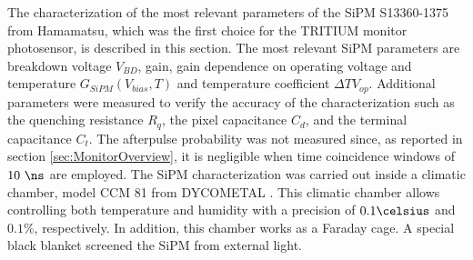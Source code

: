 The characterization of the most relevant parameters of the SiPM S13360-1375 from Hamamatsu, which was the first choice for the TRITIUM monitor photosensor, is described in this section. The most relevant SiPM parameters are breakdown voltage $V_{BD}$, gain, gain dependence on operating voltage and temperature $G_{SiPM}(V_{bias}, T)$ and temperature coefficient $\Delta T V_{op}$. Additional parameters were measured to verify the accuracy of the characterization such as the quenching resistance $R_q$, the pixel capacitance $C_d$, and the terminal capacitance $C_t$. The afterpulse probability was not measured since, as reported in section \ref{sec:MonitorOverview}, it is negligible when time coincidence windows of $10~\ns$ are employed. The SiPM characterization was carried out inside a climatic chamber, model CCM 81 from DYCOMETAL \cite{ClimaticChamberIFIMED}. This climatic chamber allows controlling both temperature and humidity with a precision of $0.1\celsius$ and $0.1\%$, respectively. In addition, this chamber works as a Faraday cage. A special black blanket \cite{BlackBlancket} screened the SiPM from external light. 

